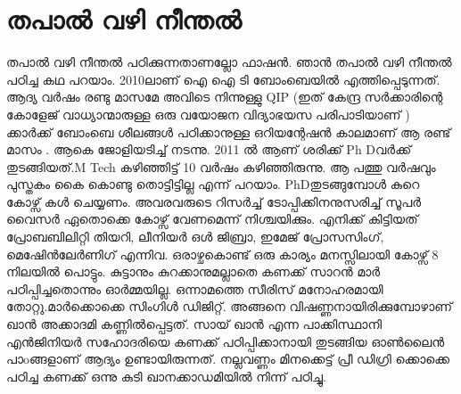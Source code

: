 \documentclass[10pt,a4paper]{report}
\begin{document}
    \section{തപാൽ വഴി നീന്തൽ }
    
    തപാൽ വഴി നീന്തൽ പഠിക്കുന്നതാണല്ലോ ഫാഷൻ. ഞാൻ തപാൽ വഴി നീന്തൽ പഠിച്ച കഥ പറയാം. 2010ലാണ് ഐ ഐ ടി ബോംബെയിൽ എത്തിപ്പെടുന്നത്. ആദ്യ വർഷം രണ്ടു മാസമേ അവിടെ നിന്നുള്ളു QIP (ഇത് കേന്ദ്ര സർക്കാരിന്റെ കോളേജ് വാധ്യാന്മാരുള്ള ഒരു വയോജന വിദ്യാഭയസ പരിപാടിയാണ് ) ക്കാർക്ക് ബോംബെ ശീലങ്ങൾ പഠിക്കാനുള്ള ഒറിയന്റേഷൻ കാലമാണ് ആ രണ്ട് മാസം . ആകെ ജോളിയടിച്ച് നടന്നു. 2011 ൽ ആണ് ശരിക്ക് Ph Dവർക്ക് തുടങ്ങിയത്.M Tech കഴിഞ്ഞിട്ട് 10 വർഷം കഴിഞ്ഞിരുന്നു. ആ പത്തു വർഷവും പുസ്തകം കൈ കൊണ്ടു തൊട്ടിട്ടില്ല എന്ന് പറയാം. PhDതുടങ്ങുമ്പോൾ കുറെ കോഴ്സ് കൾ ചെയ്യണം. അവരവരുടെ റിസർച്ച് ടോപ്പിക്കിനനുസരിച്ച് സൂപർ വൈസർ ഏതൊക്കെ കോഴ്സ് വേണമെന്ന് നിശ്ചയിക്കും. എനിക്ക് കിട്ടിയത് പ്രോബബിലിറ്റി തിയറി, ലീനിയർ ഒൾ ജിബ്രാ, ഇമേജ് പ്രോസസിംഗ്, മെഷിേൻലേർണിഗ് എന്നിവ. ഒരാഴ്ചകൊണ്ട് ഒരു കാര്യം മനസ്സിലായി കോഴ്സ് 8 നിലയിൽ പൊട്ടും. കുട്ടാനും കുറക്കാനുമല്ലാതെ കണക്ക് സാറൻ മാർ പഠിപ്പിച്ചതൊന്നും ഓർമ്മയില്ല. ഒന്നാമത്തെ സീരിസ് മനോഹരമായി തോറ്റു.മാർക്കൊക്കെ സിംഗിൾ ഡിജിറ്റ്. അങ്ങനെ വിഷണ്ണനായിരിക്കുമ്പോഴാണ് ഖാൻ അക്കാദമി കണ്ണിൽപ്പെട്ടത്. സായ് ഖാൻ എന്ന പാക്കിസ്ഥാനി എൻജിനിയർ സഹോദരിയെ കണക്ക് പഠിപ്പിക്കാനായി തുടങ്ങിയ ഓൺലൈൻ പാoങ്ങളാണ് ആദ്യം ഉണ്ടായിരുന്നത്. നല്ലവണ്ണം മിനക്കെട്ട് പ്രീ ഡിഗ്രി ക്കൊക്കെ പഠിച്ച കണക്ക് ഒന്നു കുടി ഖാനക്കാഡമിയിൽ നിന്ന് പഠിച്ചു.

  
\end{document}
